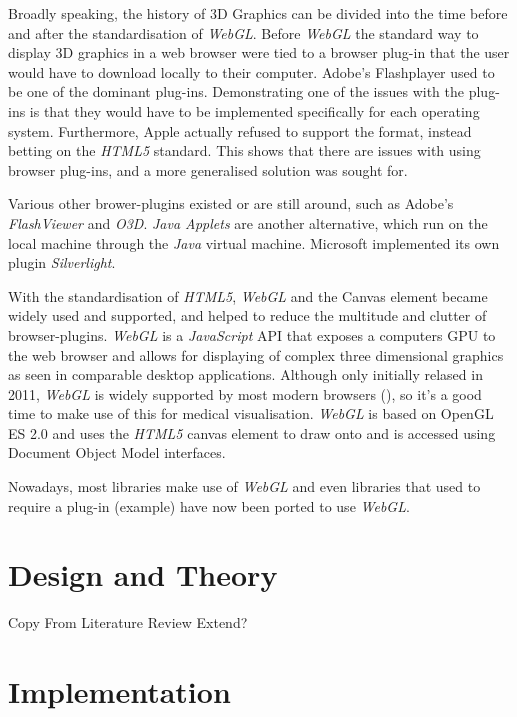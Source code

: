 \documentclass[a4paper,11pt,titlepage]{article}
\begin{document}
Broadly speaking, the history of 3D Graphics can be divided into the time before and after the standardisation of \textit{WebGL}. Before \textit{WebGL} the standard way to display 3D graphics in a web browser were tied to a browser plug-in that the user would have to download locally to their computer. Adobe's Flashplayer used to be one of the dominant plug-ins. Demonstrating one of the issues with the plug-ins is that they would have to be implemented specifically for each operating system. Furthermore, Apple actually refused to support the format, instead betting on the \textit{HTML5} standard. This shows that there are issues with using browser plug-ins, and a more generalised solution was sought for.

Various other brower-plugins existed or are still around, such as Adobe's \textit{FlashViewer} and \textit{O3D}. \textit{Java Applets} are another alternative, which run on the local machine through the \textit{Java} virtual machine. Microsoft implemented its own plugin \textit{Silverlight}.

With the standardisation of \textit{HTML5}, \textit{WebGL} and the Canvas element became widely used and supported, and helped to reduce the multitude and clutter of browser-plugins. \textit{WebGL} is a \textit{JavaScript} API that exposes a computers GPU to the web browser and allows for displaying of complex three dimensional graphics as seen in comparable desktop applications. Although only initially relased in 2011, \textit{WebGL} is widely supported by most modern browsers (\cite{webGL}), so it's a good time to make use of this for medical visualisation. \textit{WebGL} is based on OpenGL ES 2.0 and uses the \textit{HTML5} canvas element to draw onto and is accessed using Document Object Model interfaces.

Nowadays, most libraries make use of \textit{WebGL} and even libraries that used to require a plug-in (example) have now been ported to use \textit{WebGL}. 











\section{Design and Theory}

Copy From Literature Review
Extend?


\section{Implementation}
\end{document}
